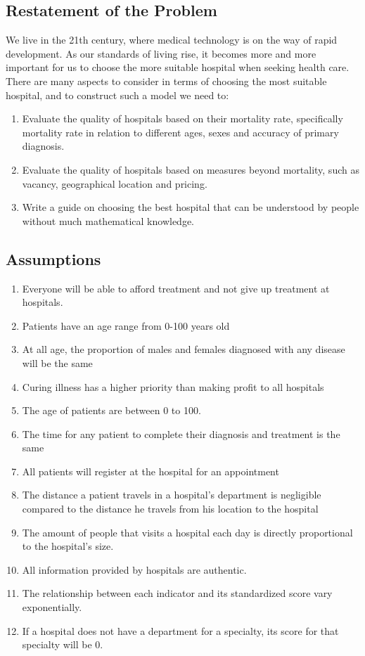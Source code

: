 \documentclass{article}
\begin{document}
\subsection{Restatement of the Problem}
We live in the 21th century, where medical technology is on the way of rapid development. As our standards of living rise, it becomes more and more important for us to choose the more suitable hospital when seeking health care. There are many aspects to consider in terms of choosing the most suitable hospital, and to construct such a model we need to:
\begin{enumerate}
    \item Evaluate the quality of hospitals based on their mortality rate, specifically mortality rate in relation to different ages, sexes and accuracy of primary diagnosis.
    \item Evaluate the quality of hospitals based on measures beyond mortality, such as vacancy, geographical location and pricing.
    \item Write a guide on choosing the best hospital that can be understood by people without much mathematical knowledge. 
\end{enumerate}
\subsection{Assumptions}
\begin{enumerate}
    \item Everyone will be able to afford treatment and not give up treatment at hospitals.
    \item Patients have an age range from 0-100 years old
    \item At all age, the proportion of males and females diagnosed with any disease will be the same
    \item Curing illness has a higher priority than making profit to all hospitals
    \item The age of patients are between 0 to 100.
    \item The time for any patient to complete their diagnosis and treatment is the same
    \item All patients will register at the hospital for an appointment
    \item The distance a patient travels in a hospital's department is negligible compared to the distance he travels from his location to the hospital          
    \item The amount of people that visits a hospital each day is directly proportional to the hospital's size. 
    \item All information provided by hospitals are authentic.
    \item The relationship between each indicator and its standardized score vary exponentially. 
    \item If a hospital does not have a department for a specialty, its score for that specialty will be 0. 
\end{enumerate}
\end{document}
